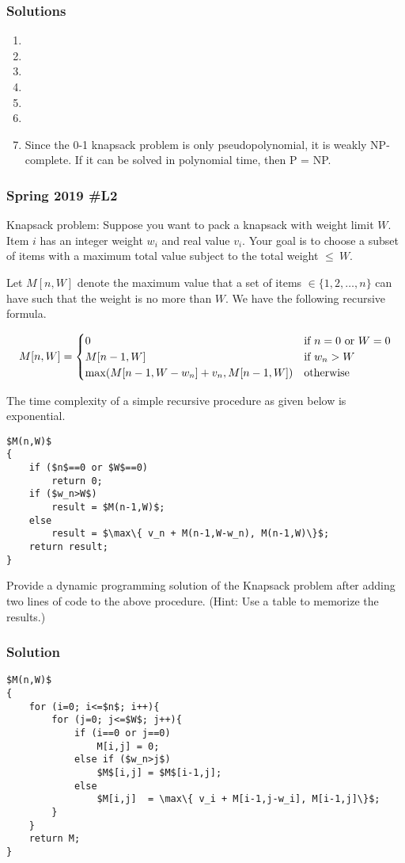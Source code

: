 \subsubsection{Solutions}

\begin{enumerate}[label=\alph*.]
	\item 
	\item 
	\item 
	\item 
	\item 
	\item 
	\item Since the 0-1 knapsack problem is only pseudopolynomial, it is weakly NP-complete.  If it can be solved in polynomial time, then P = NP.  
\end{enumerate}



\subsubsection{Spring 2019 \#L2}

Knapsack problem:  Suppose you want to pack a knapsack with weight limit $W$.  Item $i$ has an integer weight $w_i$ and real value $v_i$.  Your goal is to choose a subset of items with a maximum total value subject to the total weight $\le \ W$.  

	Let $M[n,W]$ denote the maximum value that a set of items $\in \{1,2,\dots,n\}$ can have such that the weight is no more than $W$.  We have the following recursive formula.  
	
	$$M[n,W] = 
	\begin{cases}
		0 & \text{if $n=0$ or $W=0$} \cr
		M[n-1,W] & \text{if $w_n>W$} \cr
		\max( M[n-1,W-w_n] + v_n, M[n-1,W]) & \text{otherwise} \cr
	\end{cases}
	$$
	
	The time complexity of a simple recursive procedure as given below is exponential.  
\lstset{mathescape}
\begin{lstlisting}
$M(n,W)$
{
	if ($n$==0 or $W$==0) 
		return 0;
	if ($w_n>W$)
		result = $M(n-1,W)$;
	else
		result = $\max\{ v_n + M(n-1,W-w_n), M(n-1,W)\}$;
	return result;
}
\end{lstlisting}

Provide a dynamic programming solution of the Knapsack problem after adding two lines of code to the above procedure.  (Hint:  Use a table to memorize the results.)

\subsubsection{Solution}

\lstset{mathescape}
\begin{lstlisting}
$M(n,W)$
{
	for (i=0; i<=$n$; i++){
		for (j=0; j<=$W$; j++){
			if (i==0 or j==0) 
				M[i,j] = 0;
			else if ($w_n>j$)
				$M$[i,j] = $M$[i-1,j];
			else
				$M[i,j]  = \max\{ v_i + M[i-1,j-w_i], M[i-1,j]\}$;
		}
	}
	return M;
}
\end{lstlisting}








